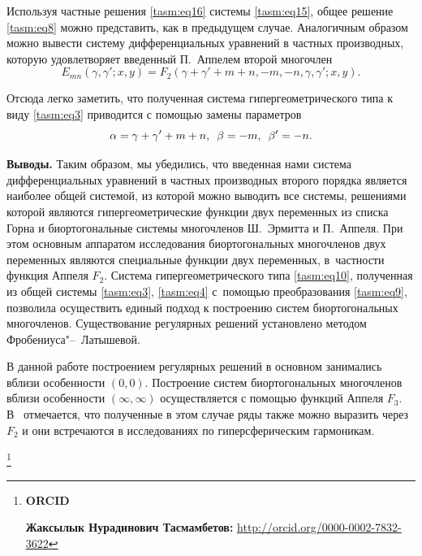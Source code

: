 Используя частные решения \eqref{tasm:eq16} системы \eqref{tasm:eq15}, общее решение \eqref{tasm:eq8}
можно представить, как в предыдущем случае. 
Аналогичным образом можно вывести систему дифференциальных уравнений в частных
производных, которую удовлетворяет введенный П.~Аппелем второй
многочлен
$$
E_{mn}(\gamma,\gamma';x,y)=F_{2}(\gamma+\gamma'+m+n,-m,
-n,\gamma,\gamma';x,y).
$$

Отсюда легко заметить, что полученная система гипергеометрического
типа к виду \eqref{tasm:eq3} приводится с помощью замены параметров
$$
\alpha=\gamma+\gamma'+m+n, \enskip \beta=-m, \enskip \beta'=-n.
$$

\smallskip

\textbf{Выводы.}
Таким образом, мы убедились, что введенная нами система дифференциальных уравнений в частных производных второго порядка
является наиболее общей системой, из которой можно выводить все системы, решениями которой являются гипергеометрические функции
двух переменных из списка Горна и биортогональные системы
многочленов Ш.~Эрмитта и П.~Аппеля. При этом основным аппаратом исследования биортогональных многочленов двух переменных являются специальные функции двух переменных, в~частности функция Аппеля
$F_{2}$. Система гипергеометрического типа  \eqref{tasm:eq10}, полученная из
общей системы \eqref{tasm:eq3}, \eqref{tasm:eq4} с~помощью преобразования  \eqref{tasm:eq9}, позволила
осуществить единый подход к построению систем биортогональных
многочленов. Существование регулярных решений установлено методом Фробениуса"--~Латышевой.

В данной работе построением регулярных решений в основном
занимались вблизи особенности $(0, 0)$. Построение систем
биортогональных многочленов вблизи особенности $(\infty, \infty)$
осуществляется с помощью функций Аппеля $F_{3}$. 
В~\cite{tasm:6} отмечается, что полученные в этом случае  ряды также можно выразить через $F_{2}$ и они встречаются в исследованиях по гиперсферическим гармоникам.




\smallskip




\thanks{{\bf ORCID}

{\bf Жаксылык Нурадинович Тасмамбетов:} \url{http://orcid.org/0000-0002-7832-3622}

}

\pagebreak


\RusRef

